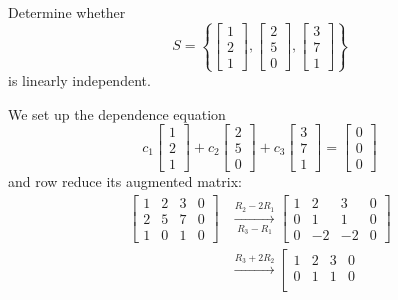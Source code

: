 \begin{example}
Determine whether
\[
S = \left\{ \begin{bmatrix} 1 \\ 2 \\ 1 \end{bmatrix}, \begin{bmatrix} 2 \\ 5 \\ 0 \end{bmatrix}, \begin{bmatrix} 3 \\ 7 \\ 1 \end{bmatrix} \right\}
\]
is linearly independent.

\begin{solution}
We set up the dependence equation
\[
c_1 \begin{bmatrix} 1 \\ 2 \\ 1 \end{bmatrix} + c_2 \begin{bmatrix} 2 \\ 5 \\ 0 \end{bmatrix} + c_3 \begin{bmatrix} 3 \\ 7 \\ 1 \end{bmatrix} = \begin{bmatrix} 0 \\ 0 \\ 0 \end{bmatrix}
\]
and row reduce its augmented matrix:
\begin{align*}
\left[\begin{array}{ccc|c}
1 & 2 & 3 & 0 \\
2 & 5 & 7 & 0 \\
1 & 0 & 1 & 0
\end{array}\right]
&\xrightarrow[R_3 - R_1]{R_2 - 2R_1}
\left[\begin{array}{ccc|c}
1 & 2 & 3 & 0 \\
0 & 1 & 1 & 0 \\
0 & -2 & -2 & 0
\end{array}\right] \\[0.6em]
&\xrightarrow{R_3 + 2R_2}
\left[\begin{array}{ccc|c}
1 & 2 & 3 & 0 \\
0 & 1 & 1 & 0 \\

\end{array}
\end{align*}
\end{solution}
\end{example}
